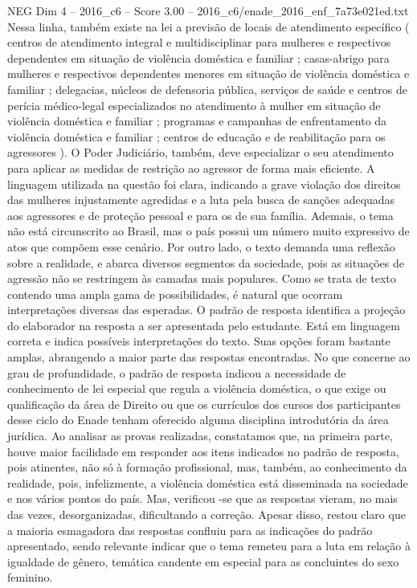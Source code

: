 \begin{textsample}{NEG Dim 4 – 2016\_c6 – Score 3.00 – 2016\_c6/enade\_2016\_enf\_7a73e021ed.txt}
Nessa linha, também existe na lei a previsão de locais de atendimento específico ( centros de atendimento integral e multidisciplinar para mulheres e respectivos dependentes em situação de violência doméstica e familiar ; casas-abrigo para mulheres e respectivos dependentes menores em situação de violência doméstica e familiar ; delegacias, núcleos de defensoria pública, serviços de saúde e centros de perícia médico-legal especializados no atendimento à mulher em situação de violência doméstica e familiar ; programas e campanhas de enfrentamento da violência doméstica e familiar ; centros de educação e de reabilitação para os agressores ).
O Poder Judiciário, também, deve especializar o seu atendimento para aplicar as medidas de restrição ao agressor de forma mais eficiente.
A linguagem utilizada na questão foi clara, indicando a grave violação dos direitos das mulheres injustamente agredidas e a luta pela busca de sanções adequadas aos agressores e de proteção pessoal e para os de sua família.
Ademais, o tema não está circunscrito ao Brasil, mas o país possui um número muito expressivo de atos que compõem esse cenário.
Por outro lado, o texto demanda uma reflexão sobre a realidade, e abarca diversos segmentos da sociedade, pois as situações de agressão não se restringem às camadas mais populares.
Como se trata de texto contendo uma ampla gama de possibilidades, é natural que ocorram interpretações diversas das esperadas.
O padrão de resposta identifica a projeção do elaborador na resposta a ser apresentada pelo estudante.
Está em linguagem correta e indica possíveis interpretações do texto.
Suas opções foram bastante amplas, abrangendo a maior parte das respostas encontradas.
No que concerne ao grau de profundidade, o padrão de resposta indicou a necessidade de conhecimento de lei especial que regula a violência doméstica, o que exige ou qualificação da área de Direito ou que os currículos dos cursos dos participantes desse ciclo do Enade tenham oferecido alguma disciplina introdutória da área jurídica.
Ao analisar as provas realizadas, constatamos que, na primeira parte, houve maior facilidade em responder aos itens indicados no padrão de resposta, pois atinentes, não só à formação profissional, mas, também, ao conhecimento da realidade, pois, infelizmente, a violência doméstica está disseminada na sociedade e nos vários pontos do país.
Mas, verificou -se que as respostas vieram, no mais das vezes, desorganizadas, dificultando a correção.
Apesar disso, restou claro que a maioria esmagadora das respostas confluiu para as indicações do padrão apresentado, sendo relevante indicar que o tema remeteu para a luta em relação à igualdade de gênero, temática candente em especial para as concluintes do sexo feminino.

\end{textsample}
